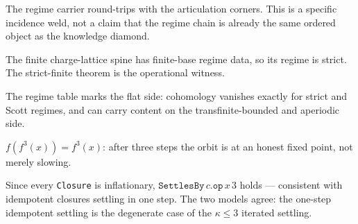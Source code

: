 \begin{theorem}\label{thm:regime-is-four-corner}\leanok{}
The regime carrier round-trips with the articulation corners.  This is a
specific incidence weld, not a claim that the regime chain is already the same
ordered object as the knowledge diamond.
\end{theorem}
\begin{theorem}\label{thm:spine-is-strict-regime}\leanok{}
The finite charge-lattice spine has finite-base regime data, so its regime is
strict.  The strict-finite theorem is the operational witness.
\end{theorem}
\begin{theorem}\label{thm:regime-cohomology-vanishes-iff}\leanok{}
The regime table marks the flat side: cohomology vanishes exactly for strict
and Scott regimes, and can carry content on the transfinite-bounded and
aperiodic side.
\end{theorem}
\begin{theorem}\label{thm:settled-fixed}\leanok{}
$f(f^3(x)) = f^3(x)$: after three steps the orbit is at an honest fixed point,
not merely slowing.
\end{theorem}
\begin{corollary}\label{cor:closure-strict-finite}\leanok{}
Since every \texttt{Closure} is inflationary, $\texttt{SettlesBy}\,c.\texttt{op}\,x\,3$
holds --- consistent with idempotent closures settling in one step. The two
models agree: the one-step idempotent settling is the degenerate case of the
$\kappa \le 3$ iterated settling.
\end{corollary}
